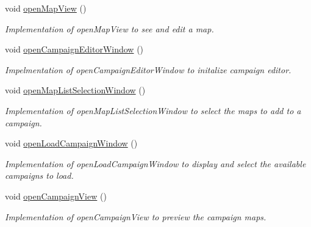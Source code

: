 \begin{DoxyCompactItemize}
\hypertarget{class_editor_g_u_i_a83f04b7568d9e6df9fd9c11ac1ce5154}{}\label{class_editor_g_u_i_a83f04b7568d9e6df9fd9c11ac1ce5154} 
void \hyperlink{class_editor_g_u_i_a83f04b7568d9e6df9fd9c11ac1ce5154}{open\+Map\+View} ()
\begin{DoxyCompactList}\small\item\em Implementation of open\+Map\+View to see and edit a map. \end{DoxyCompactList}\item 
\hypertarget{class_editor_g_u_i_a8666109538677294c6c0ff887fabe3b4}{}\label{class_editor_g_u_i_a8666109538677294c6c0ff887fabe3b4} 
void \hyperlink{class_editor_g_u_i_a8666109538677294c6c0ff887fabe3b4}{open\+Campaign\+Editor\+Window} ()
\begin{DoxyCompactList}\small\item\em Impelmentation of open\+Campaign\+Editor\+Window to initalize campaign editor. \end{DoxyCompactList}\item 
\hypertarget{class_editor_g_u_i_ab01a34e8ee51e9ea4d875768963fd4fa}{}\label{class_editor_g_u_i_ab01a34e8ee51e9ea4d875768963fd4fa} 
void \hyperlink{class_editor_g_u_i_ab01a34e8ee51e9ea4d875768963fd4fa}{open\+Map\+List\+Selection\+Window} ()
\begin{DoxyCompactList}\small\item\em Implementation of open\+Map\+List\+Selection\+Window to select the maps to add to a campaign. \end{DoxyCompactList}\item 
\hypertarget{class_editor_g_u_i_a1ad2c0ab996ad413ac5230234d79e6ea}{}\label{class_editor_g_u_i_a1ad2c0ab996ad413ac5230234d79e6ea} 
void \hyperlink{class_editor_g_u_i_a1ad2c0ab996ad413ac5230234d79e6ea}{open\+Load\+Campaign\+Window} ()
\begin{DoxyCompactList}\small\item\em Implementation of open\+Load\+Campaign\+Window to display and select the available campaigns to load. \end{DoxyCompactList}\item 
\hypertarget{class_editor_g_u_i_a63091d9097bf68884ff86f3d8be44cf6}{}\label{class_editor_g_u_i_a63091d9097bf68884ff86f3d8be44cf6} 
void \hyperlink{class_editor_g_u_i_a63091d9097bf68884ff86f3d8be44cf6}{open\+Campaign\+View} ()
\begin{DoxyCompactList}\small\item\em Implementation of open\+Campaign\+View to preview the campaign maps. \end{DoxyCompactList}\item 

\end{DoxyCompactItemize}
